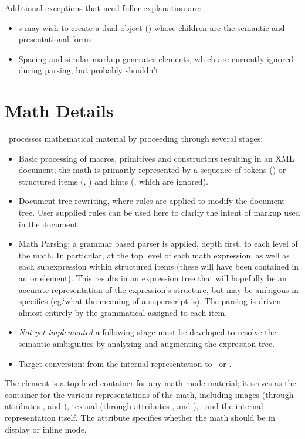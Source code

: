 \documentclass{report}
\begin{document}
Additional exceptions that need fuller explanation are: 
\begin{itemize}
 \item {}s may wish to create a dual object () whose children are 
the semantic and presentational forms.
 \item Spacing and similar markup generates  elements, which are currently ignored
during parsing, but probably shouldn't.
\end{itemize}

\section{Math Details}\label{math.details}
\LaTeXML\ processes mathematical material by proceeding through several stages:
\begin{itemize}
\item Basic processing of macros, primitives and constructors resulting in
   an XML document; the math is primarily represented by a sequence of
   tokens () or structured items (, ) and
   hints (, which are ignored).
\item Document tree rewriting, where rules are applied to modify the document tree.
   User supplied rules can be used here to clarify the intent of markup used in the document.
\item Math Parsing; a grammar based parser is applied, depth first, to each level of the math.
   In particular, at the top level of each math expression, as well as each
   subexpression within structured items (these will have been contained in
   an  or  element).  This results in an expression tree
   that will hopefully be an accurate representation of the expression's structure,
   but may be ambigous in specifics (eg.`what the meaning of a superscript is).
   The parsing is driven almost entirely by the grammatical  assigned
   to each item.
\item \emph{Not yet implemented} a following stage must be developed to resolve
   the semantic ambiguities by analyzing and augmenting the expression tree.
\item Target conversion: from the internal  representation to
   \MathML\ or \OpenMath.
\end{itemize}

The  element is a top-level container for any math mode material; it
serves as the container for the various representations of the math, including
images (through attributes ,  and ), 
textual (through attributes ,  and ),
\MathML\ and the internal representation itself.  
The  attribute specifies whether the math should be in display or inline mode.
\end{document}

